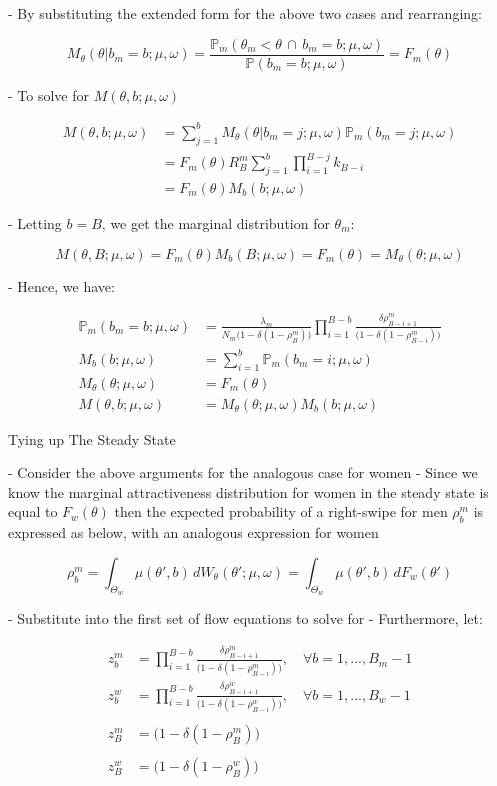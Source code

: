 - By substituting the extended form for the above two cases and rearranging:

$$
M_{\theta}(\theta|b_m=b;\mu,\omega)=\frac{\mathbb{P}_m(\theta_m<\theta \,\cap \, b_m=b;\mu,\omega)}{\mathbb{P}(b_m=b;\mu,\omega)}=F_m(\theta)
$$

- To solve for $M(\theta,b;\mu,\omega)$

$$
\begin{aligned}M(\theta,b;\mu,\omega)&=\sum^b_{j=1} M_{\theta}(\theta|b_m=j;\mu,\omega)\mathbb{P}_m(b_m=j;\mu,\omega)\\&=F_m(\theta)R^m_{B}\sum^b_{j=1}\prod^{B-j}_{i=1} k_{B-i}\\&=F_m(\theta)M_b(b;\mu,\omega)\end{aligned}
$$

- Letting $b=B$, we get the marginal distribution for $\theta_m$:

$$
M(\theta,B;\mu,\omega)=F_m(\theta)M_b(B;\mu,\omega)=F_m(\theta)=M_\theta(\theta;\mu,\omega)
$$

- Hence, we have:

$$
\begin{aligned} \mathbb{P}_m(b_m=b;\mu,\omega)&=\frac{\lambda_m  }{N_m\Big(1-\delta (1-\rho^m_B) \Big)}\prod^{B-b}_{i=1}\frac{\delta\rho^m_{B-i+1}}{\Big(1-\delta (1-\rho^m_{B-i}) \Big)}\\M_b(b;\mu,\omega)&=\sum^b_{i=1}\mathbb{P}_m(b_m=i;\mu,\omega)\\M_{\theta}(\theta;\mu,\omega)&=F_m(\theta)\\M(\theta,b;\mu,\omega)&=M_{\theta}(\theta;\mu,\omega)M_b(b;\mu,\omega)\end{aligned}
$$

 Tying up The Steady State

- Consider the above arguments for the analogous case for women
    - Since we know the marginal attractiveness distribution for women in the steady state is equal to $F_w(\theta)$ then the expected probability of a right-swipe for men $\rho^m_b$ is expressed as below, with an analogous expression for women

$$
\rho^m_b=\int_{\Theta_w} \mu(\theta',b)\,dW_\theta(\theta';\mu,\omega)=\int_{\Theta_w} \mu(\theta',b)\,dF_w(\theta')
$$

- Substitute into the first set of flow equations to solve for
- Furthermore, let:

$$
\begin{aligned} z^m_b &=\prod^{B-b}_{i=1}\frac{\delta\rho^m_{B-i+1}}{\Big(1-\delta (1-\rho^m_{B-i}) \Big)}, \quad \forall b=1,...,B_m-1\\z^w_b&=\prod^{B-b}_{i=1}\frac{\delta\rho^w_{B-i+1}}{\Big(1-\delta (1-\rho^w_{B-i}) \Big)} , \quad \forall b=1,...,B_w-1\\\\ z^m_B&=\Big(1-\delta (1-\rho^m_B) \Big) \\\\ z^w_B&=\Big(1-\delta (1-\rho^w_B) \Big) \end{aligned}
$$

